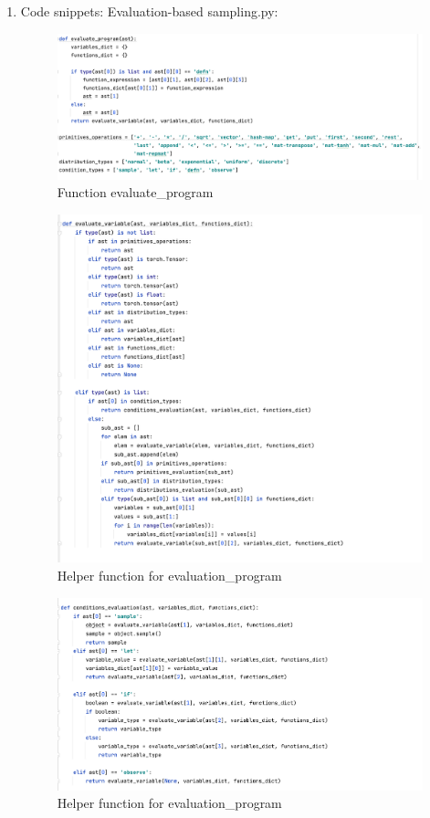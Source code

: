 \documentclass{article}
\begin{document}
\begin{enumerate}
\newpage
\item Code snippets:
Evaluation-based sampling.py:
\begin{figure}[!htp]
	\centering
	\includegraphics[scale=0.4]{../figs/evaluation_code1}
	\caption{Function evaluate_program}
\end{figure}

\begin{figure}[!htp]
	\centering
	\includegraphics[scale=0.5]{../figs/evaluation_code2}
	\caption{Helper function for evaluation_program}
\end{figure}

\begin{figure}[!htp]
	\centering
	\includegraphics[scale=0.5]{../figs/evaluation_code3}
	\caption{Helper function for evaluation_program}
\end{figure}


\end{enumerate}
\end{document}
